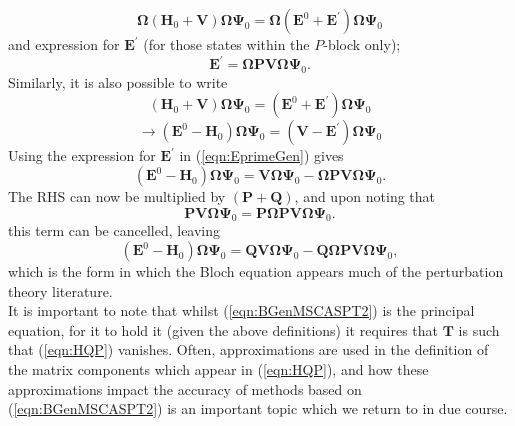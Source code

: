 \begin{equation}
\boldsymbol{\Omega}(\mathbf{H}_{0}+\mathbf{V})\boldsymbol{\Omega}\mathbf{\Psi}_{0} =
\boldsymbol{\Omega}(\mathbf{E}^{0}+\mathbf{E}^{'})\boldsymbol{\Omega}\mathbf{\Psi}_{0}
\label{eqn:WWperturbedHE}
\end{equation}
and expression for $\mathbf{E}^{'}$ (for those states within the $P$-block only);
\begin{equation}
\mathbf{E}^{'} = \boldsymbol{\Omega}\mathbf{P}\mathbf{V}\boldsymbol{\Omega}\mathbf{\Psi}_{0}.
\label{eqn:EprimeGen}
\end{equation}
Similarly, it is also possible to write
\begin{equation*}
(\mathbf{H}_{0}+\mathbf{V})\boldsymbol{\Omega}\mathbf{\Psi}_{0} =
(\mathbf{E}^{0}+\mathbf{E}^{'})\boldsymbol{\Omega}\mathbf{\Psi}_{0}
\end{equation*}
\begin{equation}
\rightarrow
(\mathbf{E}^{0}-\mathbf{H}_{0})\boldsymbol{\Omega}\mathbf{\Psi}_{0} =
 (\mathbf{V}-\mathbf{E}^{'})\boldsymbol{\Omega}\mathbf{\Psi}_{0} 
\label{eqn:WperturbedHE}
\end{equation}
Using the expression for $\mathbf{E}^{'}$ in  (\ref{eqn:EprimeGen}) gives
\begin{equation}
(\mathbf{E}^{0}-\mathbf{H}_{0})\boldsymbol{\Omega}\mathbf{\Psi}_{0} =
\mathbf{V}\boldsymbol{\Omega}\mathbf{\Psi}_{0} - 
\boldsymbol{\Omega}\mathbf{P}\mathbf{V}\boldsymbol{\Omega}\mathbf{\Psi}_{0}.
\label{eqn:BGenIntermediate}
\end{equation}
The RHS can now be multiplied by $(\mathbf{P}+\mathbf{Q})$,  and upon noting that
\begin{equation*}
\mathbf{P}\mathbf{V}\boldsymbol{\Omega}\mathbf{\Psi}_{0} = \mathbf{P}\boldsymbol{\Omega}\mathbf{P}\mathbf{V}\boldsymbol{\Omega}\mathbf{\Psi}_{0}.
\end{equation*}
this term can be cancelled, leaving
\begin{equation}
(\mathbf{E}^{0}-\mathbf{H}_{0})\boldsymbol{\Omega}\mathbf{\Psi}_{0} =
\mathbf{Q}\mathbf{V}\boldsymbol{\Omega}\mathbf{\Psi}_{0} - 
\mathbf{Q}\boldsymbol{\Omega}\mathbf{P}\mathbf{V}\boldsymbol{\Omega}\mathbf{\Psi}_{0},
\label{eqn:BGenMSCASPT2}
\end{equation}
which is the form in which the Bloch equation appears much of the perturbation theory literature.\\

\noindent It is important to note that whilst (\ref{eqn:BGenMSCASPT2}) is the principal equation,
for it to hold it (given the above definitions) it requires that $\mathbf{T}$ is such that
(\ref{eqn:HQP}) vanishes. Often, approximations are used in the definition of the matrix components
which appear in (\ref{eqn:HQP}), and how these approximations impact the accuracy of methods based on
(\ref{eqn:BGenMSCASPT2}) is an important topic which we return to in due course.

